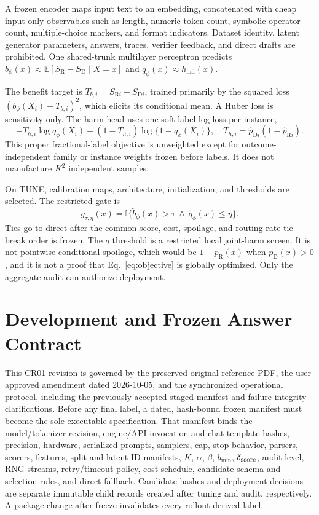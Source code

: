 \documentclass{article}
\newcommand{\D}{\ensuremath{\mathrm{D}}}
\newcommand{\Rpol}{\ensuremath{\mathrm{R}}}
\newcommand{\1}{\mathbb{I}}
\newcommand{\E}{\mathbb{E}}
\newcommand{\hInd}{h_{\mathrm{ind}}}
\begin{document}
A frozen encoder maps input text to an embedding, concatenated with cheap input-only observables such as length, numeric-token count, symbolic-operator count, multiple-choice markers, and format indicators. Dataset identity, latent generator parameters, answers, traces, verifier feedback, and direct drafts are prohibited. One shared-trunk multilayer perceptron predicts
$b_\phi(x)\approx\E[S_\Rpol-S_\D\mid X=x]$ and $q_\phi(x)\approx\hInd(x)$.

The benefit target is $T_{b,i}=\bar S_{\Rpol i}-\bar S_{\D i}$, trained primarily by the squared loss $(b_\phi(X_i)-T_{b,i})^2$, which elicits its conditional mean. A Huber loss is sensitivity-only. The harm head uses one soft-label log loss per instance,
\begin{equation}
 -T_{h,i}\log q_\phi(X_i)-(1-T_{h,i})\log\{1-q_\phi(X_i)\},
 \quad T_{h,i}=\widehat p_{\D i}(1-\widehat p_{\Rpol i}).
 \label{eq:harm-loss}
\end{equation}
This proper fractional-label objective \citep{gneiting2007strictly} is unweighted except for outcome-independent family or instance weights frozen before labels. It does not manufacture $K^2$ independent samples.

On TUNE, calibration maps, architecture, initialization, and thresholds are selected. The restricted gate is
\begin{equation}
 g_{\tau,\eta}(x)=\1\{\widetilde b_\phi(x)>\tau\ \land\ \widetilde q_\phi(x)\leq\eta\}.
 \label{eq:gate}
\end{equation}
Ties go to direct after the common score, cost, spoilage, and routing-rate tie-break order is frozen. The $q$ threshold is a restricted local joint-harm screen. It is not pointwise conditional spoilage, which would be $1-p_\Rpol(x)$ when $p_\D(x)>0$, and it is not a proof that Eq.~\ref{eq:objective} is globally optimized. Only the aggregate audit can authorize deployment.

\section{Development and Frozen Answer Contract}
This CR01 revision is governed by the preserved original reference PDF, the user-approved amendment dated 2026-10-05, and the synchronized operational protocol, including the previously accepted staged-manifest and failure-integrity clarifications. Before any final label, a dated, hash-bound frozen manifest must become the sole executable specification. That manifest binds the model/tokenizer revision, engine/API invocation and chat-template hashes, precision, hardware, serialized prompts, samplers, cap, stop behavior, parsers, scorers, features, split and latent-ID manifests, $K$, $\alpha$, $\beta$, $b_{\min}$, $\delta_{\rm score}$, audit level, RNG streams, retry/timeout policy, cost schedule, candidate schema and selection rules, and direct fallback. Candidate hashes and deployment decisions are separate immutable child records created after tuning and audit, respectively. A package change after freeze invalidates every rollout-derived label.
\end{document}
